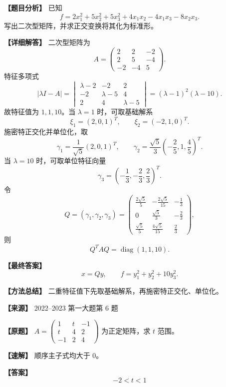 \documentclass[11pt,a4paper,UTF8]{ctexart}
\newcommand{\diag}{\operatorname{diag}}
\begin{document}
\begin{answerbox}
\textbf{【题目分析】} 已知
\[
f=2x_1^2+5x_2^2+5x_3^2+4x_1x_2-4x_1x_3-8x_2x_3.
\]
写出二次型矩阵，并求正交变换将其化为标准形。

\textbf{【详细解答】} 二次型矩阵为
\[
A=\begin{pmatrix}2&2&-2\\2&5&-4\\-2&-4&5\end{pmatrix}.
\]
特征多项式
\[
|\lambda I-A|
=\begin{vmatrix}
\lambda-2&-2&2\\
-2&\lambda-5&4\\
2&4&\lambda-5
\end{vmatrix}
=(\lambda-1)^2(\lambda-10).
\]
故特征值为 $1,1,10$。当 $\lambda=1$ 时，可取基础解系
\[
\xi_1=(2,0,1)^T,\qquad \xi_2=(-2,1,0)^T.
\]
施密特正交化并单位化，取
\[
\gamma_1=\frac1{\sqrt5}(2,0,1)^T,\qquad
\gamma_2=\frac{\sqrt5}{3}\left(-\frac25,1,\frac45\right)^T.
\]
当 $\lambda=10$ 时，可取单位特征向量
\[
\gamma_3=\left(-\frac13,-\frac23,\frac23\right)^T.
\]
令
\[
Q=(\gamma_1,\gamma_2,\gamma_3)
=\begin{pmatrix}
\frac{2\sqrt5}{5}&-\frac{2\sqrt5}{15}&-\frac13\\
0&\frac{\sqrt5}{3}&-\frac23\\
\frac{\sqrt5}{5}&\frac{4\sqrt5}{15}&\frac23
\end{pmatrix},
\]
则
\[
Q^TAQ=\diag(1,1,10).
\]

\textbf{【最终答案】}
\[
x=Qy,\qquad f=y_1^2+y_2^2+10y_3^2.
\]

\textbf{【方法总结】} 二重特征值下先取基础解系，再施密特正交化、单位化。
\end{answerbox}

\begin{answerbox}
\textbf{【来源】} 2022--2023 第一大题第 6 题

\textbf{【原题】}
$A=\begin{pmatrix}1&t&-1\\t&4&2\\-1&2&4\end{pmatrix}$ 为正定矩阵，求 $t$ 范围。

\textbf{【速解】}
顺序主子式均大于 $0$。

\textbf{【答案】}
\[-2<t<1\]
\end{answerbox}
\end{document}

